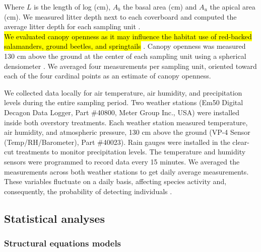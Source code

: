 \vspace{0.5cm}

Where $L$ is the length of log (cm), $A_b$ the basal area (cm) and $A_u$ the apical area (cm).
We measured litter depth next to each coverboard and computed the average litter depth for each sampling unit \citep{Mazerolle2021Woodlandsalamander}. \\
\hl{We evaluated canopy openness as it may influence the habitat use of red-backed salamanders, ground beetles, and springtails} \citep{messereForestFloorDistribution1998,koivulaBorealCarabidbeetleColeoptera2002a,tilghmanMetaanalysisEffectsCanopy2012,henneronForestPlantCommunity2017}.
Canopy openness was measured 130 cm above the ground at the center of each sampling unit using a spherical densiometer \citep{lemmonSphericalDensiometerEstimating1956}. 
We averaged four measurements per sampling unit, oriented toward each of the four cardinal points as an estimate of canopy openness.

We collected data locally for air temperature, air humidity, and precipitation levels during the entire sampling period. 
Two weather stations (Em50 Digital Decagon Data Logger, Part \#40800, Meter Group Inc., USA) were installed inside both overstory treatments. 
Each weather station measured temperature, air humidity, and atmospheric pressure, 130 cm above the ground (VP-4 Sensor (Temp/RH/Barometer), Part \#40023). 
Rain gauges were installed in the clear-cut treatments to monitor precipitation levels. 
The temperature and humidity sensors were programmed to record data every 15 minutes. 
We averaged the measurements across both weather stations to get daily average measurements. 
These variables fluctuate on a daily basis, affecting species activity and, consequently, the probability of detecting individuals \citep{spotilaRoleTemperatureWater1972,butterfieldCarabidLifeCycle1996,loveiEcologyBehaviorGround1996,odonnellPredictingVariationMicrohabitat2014a}.


\subsection*{Statistical analyses}
\label{subsec:analyses}


\subsubsection{Structural equations models} 

